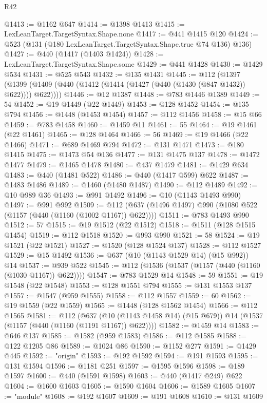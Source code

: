 \begin{lexlean}{R42}
\begin{coremodule}
@1413 := @1162 @647
@1414 := @1398 @1413
@1415 := LexLeanTarget.TargetSyntax.Shape.none
@1417 := @441 @1415 @120
@1424 := @523 (@131 (@180 LexLeanTarget.TargetSyntax.Shape.true @74 @136) @136)
@1427 := @440 (@1417 (@1403 @1424))
@1428 := LexLeanTarget.TargetSyntax.Shape.some
@1429 := @441 @1428
@1430 := @1429 @534
@1431 := @525 @543
@1432 := @135 @1431
@1445 := @112
    (@1397 (@1399 (@1409 (@440 (@1412 (@1414 (@1427 (@440 (@1430 (@847 @1432)) @622)))) @622))))
@1446 := @12 @1387
@1448 := @783 @1446 @1389
@1449 := 54
@1452 := @19 @1449 (@22 @1449)
@1453 := @128 @1452
@1454 := @135 @794
@1456 := @1448 (@1453 @1454)
@1457 := @112 @1456
@1458 := @15 @66
@1459 := @783 @1458
@1460 := @1459 @11
@1461 := 55
@1464 := @19 @1461 (@22 @1461)
@1465 := @128 @1464
@1466 := 56
@1469 := @19 @1466 (@22 @1466)
@1471 := @689 @1469 @794
@1472 := @131 @1471
@1473 := @180 @1415
@1475 := @1473 @54 @136
@1477 := @131 @1475 @137
@1478 := @1472 @1477
@1479 := @1465 @1478
@1480 := @437 @1479
@1481 := @1429 @634
@1483 := @440 (@1481 @522)
@1486 := @440 (@1417 @599) @622
@1487 := @1483 @1486
@1489 := @1460 (@1480 @1487)
@1490 := @112 @1489
@1492 := @10 @989 @36
@1493 := @991 @1492
@1496 := @10 (@1143 @1493 @990)
@1497 := @991 @992
@1509 := @112 (@637 (@1496 @1497) @990 (@1080 @522 (@1157 (@440 (@1160 (@1002 @1167)) @622))))
@1511 := @783 @1493 @990
@1512 := 57
@1515 := @19 @1512 (@22 @1512)
@1518 := @1511 (@128 @1515 @1454)
@1519 := @112 @1518
@1520 := @993 @990
@1521 := 58
@1524 := @19 @1521 (@22 @1521)
@1527 := @1520 (@128 @1524 @137)
@1528 := @112 @1527
@1529 := @15 @1492
@1536 := @637 (@10 (@1143 @1529 @14) (@15 @992)) @14
@1537 := @939 @522
@1545 := @112 (@1536 (@1537 (@1157 (@440 (@1160 (@1030 @1167)) @622))))
@1547 := @783 @1529 @14
@1548 := 59
@1551 := @19 @1548 (@22 @1548)
@1553 := @128 @1551 @794
@1555 := @131 @1553 @137
@1557 := @1547 (@959 @1555)
@1558 := @112 @1557
@1559 := 60
@1562 := @19 @1559 (@22 @1559)
@1565 := @1448 (@128 @1562 @1454)
@1566 := @112 @1565
@1581 := @112
    (@637 (@10 (@1143 @1458 @14) (@15 @679)) @14 (@1537 (@1157 (@440 (@1160 (@1191 @1167)) @622))))
@1582 := @1459 @14
@1583 := @646 @137
@1585 := @1582 (@959 @1583)
@1586 := @112 @1585
@1588 := @122 @1205 @86
@1589 := @1024 @86
@1590 := @1152 @277
@1591 := @1429 @445
@1592 := "origin"
@1593 := @192 @1592
@1594 := @191 @1593
@1595 := @131 @1594
@1596 := @1181 @251
@1597 := @1595 @1596
@1598 := @189 @1597
@1600 := @440 (@1591 @1598)
@1603 := @440 (@1417 @249) @622
@1604 := @1600 @1603
@1605 := @1590 @1604
@1606 := @1589 @1605
@1607 := "module"
@1608 := @192 @1607
@1609 := @191 @1608
@1610 := @131 @1609

\end{coremodule}
\end{lexlean}
